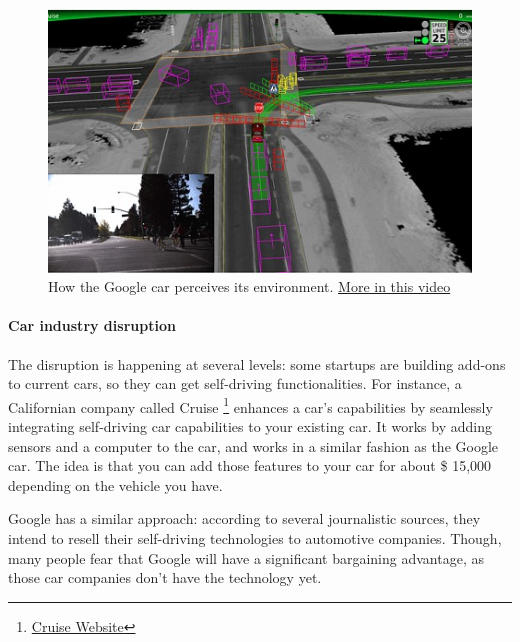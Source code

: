 \documentclass[12pt]{article}
\begin{document}
\begin{figure}[ht]
    \centering
    \includegraphics[width=\linewidth]{google-car}
    \caption{How the Google car perceives its environment.
    \href{https://www.youtube.com/watch?v=dk3oc1Hr62g}{More in this video}}
    \label{fig:google_car}
\end{figure}


\smallskip

\paragraph{Car industry disruption}

The disruption is happening at several levels: some startups are building add-ons
to current cars, so they can get self-driving functionalities. For instance,
a Californian company called Cruise
\footnote{\href{http://www.getcruise.com}{Cruise Website}}
enhances a car's capabilities by seamlessly integrating self-driving car
capabilities to your existing car. It works by adding sensors and a computer to
the car, and works in a similar fashion as the Google car. The idea is that you
can add those features to your car for about \$ 15,000 depending on the vehicle
you have.

Google has a similar approach: according to several journalistic
sources, they intend to resell their self-driving technologies to automotive
companies. Though, many people fear that Google will have a significant
bargaining advantage, as those car companies don't have the technology yet.\\
\end{document}
